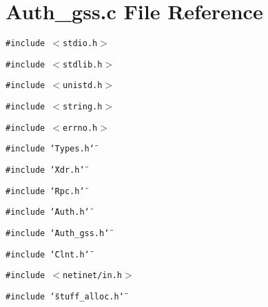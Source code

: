 \section{Auth\_\-gss.c File Reference}
\label{Auth__gss_8c}
{\tt \#include $<$stdio.h$>$}\par
{\tt \#include $<$stdlib.h$>$}\par
{\tt \#include $<$unistd.h$>$}\par
{\tt \#include $<$string.h$>$}\par
{\tt \#include $<$errno.h$>$}\par
{\tt \#include \char`\"{}Types.h\char`\"{}}\par
{\tt \#include \char`\"{}Xdr.h\char`\"{}}\par
{\tt \#include \char`\"{}Rpc.h\char`\"{}}\par
{\tt \#include \char`\"{}Auth.h\char`\"{}}\par
{\tt \#include \char`\"{}Auth\_\-gss.h\char`\"{}}\par
{\tt \#include \char`\"{}Clnt.h\char`\"{}}\par
{\tt \#include $<$netinet/in.h$>$}\par
{\tt \#include \char`\"{}stuff\_\-alloc.h\char`\"{}}\par
